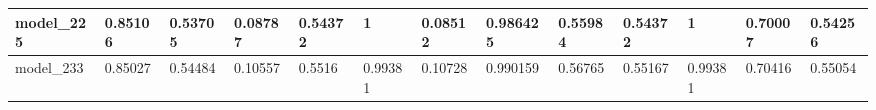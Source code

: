 \begin{tabular}{|l|l|l|l|l|l|l|l|l|l|l|l|l|}
model\_225     & 0.85106     & 0.53705        & 0.08787      & 0.54372          & 1                    & 0.08512              & 0.986425     & 0.55984           & 0.54372            & 1               & 0.70007     & 0.54256      \\ \hline
model\_233     & 0.85027     & 0.54484        & 0.10557      & 0.5516           & 0.99381              & 0.10728              & 0.990159     & 0.56765           & 0.55167            & 0.99381         & 0.70416     & 0.55054      \\ \hline
\end{tabular}